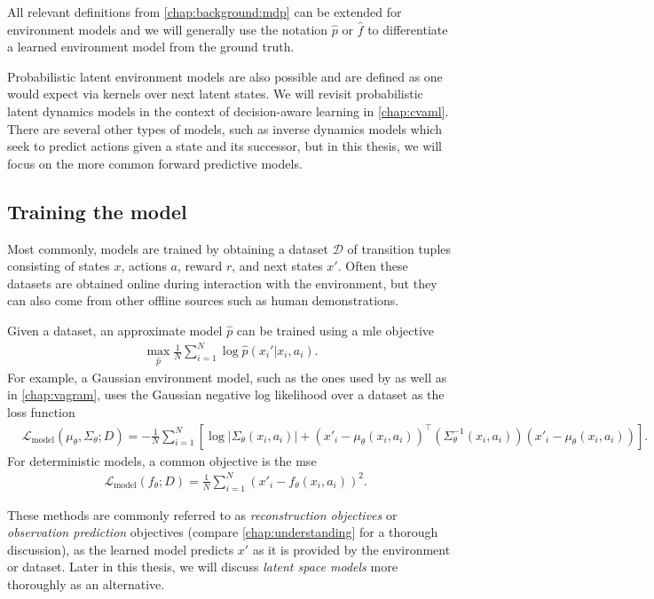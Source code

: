 All relevant definitions from \autoref{chap:background:mdp} can be extended for environment models and we will generally use the notation $\hat{p}$ or $\hat{f}$ to differentiate a learned environment model from the ground truth.

Probabilistic latent environment models are also possible and are defined as one would expect via kernels over next latent states.
We will revisit probabilistic latent dynamics models in the context of decision-aware learning in \autoref{chap:cvaml}.
There are several other types of models, such as inverse dynamics models which seek to predict actions given a state and its successor, but in this thesis, we will focus on the more common forward predictive models.

\subsection{Training the model}

Most commonly, models are trained by obtaining a dataset $\mathcal{D}$ of transition tuples consisting of states $x$, actions $a$, reward $r$, and next states $x'$. 
Often these datasets are obtained online during interaction with the environment, but they can also come from other offline sources such as human demonstrations.

Given a dataset, an approximate model $\hat{p}$ can be trained using a \ac{mle} objective 
\begin{align}
\max_{\hat{p}} \frac{1}{N}\sum_{i=1}^N \log \hat{p}(x_i'|x_i,a_i).
\end{align}
For example, a Gaussian environment model, such as the ones used by \textcite{pets,janner2019mbpo} as well as in \autoref{chap:vagram}, uses the Gaussian negative log likelihood over a dataset as the loss function
\begin{align}
    &\mathcal{L}_\mathrm{model}(\mu_\theta, \Sigma_\theta; D) = - \frac{1}{N} \sum_{i=1}^N \left[\log |\Sigma_\theta(x_i, a_i)| + (x'_i - \mu_\theta(x_i, a_i))^\top \left(\Sigma^{-1}_\theta(x_i, a_i) \right) (x'_i - \mu_\theta(x_i, a_i)) \right].
\end{align}
For deterministic models, a common objective is the \ac{mse}
\begin{align}
    &\mathcal{L}_\mathrm{model}(f_\theta; D) = \frac{1}{N} \sum_{i=1}^N (x'_i - f_\theta(x_i, a_i))^2.
\end{align}

These methods are commonly referred to as \emph{reconstruction objectives} or \emph{observation prediction} objectives (compare \autoref{chap:understanding} for a thorough discussion), as the learned model predicts $x'$ as it is provided by the environment or dataset.
Later in this thesis, we will discuss \emph{latent space models} more thoroughly as an alternative.

